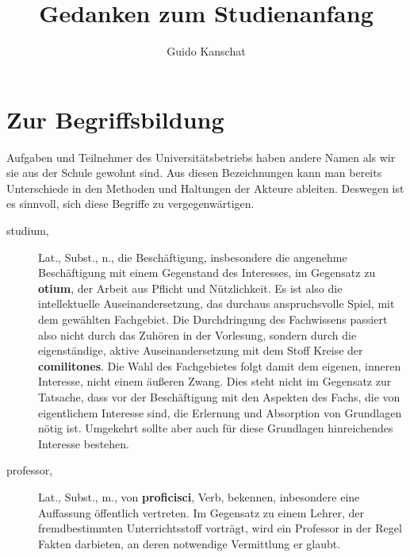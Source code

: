 \documentclass{article}
\title{Gedanken zum Studienanfang}
\author{Guido Kanschat}
\begin{document}
\maketitle

\section{Zur Begriffsbildung}

Aufgaben und Teilnehmer des Universitätsbetriebs haben andere Namen als wir sie aus der Schule gewohnt sind. Aus diesen Bezeichnungen kann man bereits Unterschiede in den Methoden und Haltungen der Akteure ableiten. Deswegen ist es sinnvoll, sich diese Begriffe zu vergegenwärtigen.

\begin{description}

\item[studium,] Lat., Subst., n., die Beschäftigung, insbesondere die angenehme Beschäftigung mit einem Gegenstand des Interesses, im Gegensatz zu \textbf{otium}, der Arbeit aus Pflicht und Nützlichkeit. Es ist also die intellektuelle Auseinandersetzung, das durchaus anspruchsvolle Spiel, mit dem gewählten Fachgebiet. Die Durchdringung des Fachwissens passiert also nicht durch das Zuhören in der Vorlesung, sondern durch die eigenständige, aktive Auseinandersetzung mit dem Stoff Kreise der \textbf{comilitones}. Die Wahl des Fachgebietes folgt damit dem eigenen, inneren Interesse, nicht einem äußeren Zwang. Dies steht nicht im Gegensatz zur Tatsache, dass vor der Beschäftigung mit den Aspekten des Fachs, die von eigentlichem Interesse sind, die Erlernung und Absorption von Grundlagen nötig ist. Umgekehrt sollte aber auch für diese Grundlagen hinreichendes Interesse bestehen.

\item[professor,] Lat., Subst., m., von \textbf{proficisci}, Verb, bekennen, inbesondere eine Auffassung öffentlich vertreten. Im Gegensatz zu einem Lehrer, der fremdbestimmten Unterrichtsstoff vorträgt, wird ein Professor in der Regel Fakten darbieten, an deren notwendige Vermittlung er glaubt.

\end{description}
\end{document}
